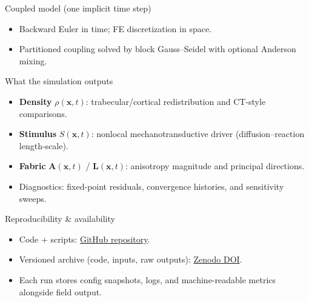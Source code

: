 \documentclass[final]{beamer}
\newlength{\colwidth}
\begin{document}
\begin{frame}[t]
\begin{columns}[t,totalwidth=\textwidth]
\begin{column}{\colwidth}
\begin{alertblock}{Coupled model (one implicit time step)}
\begin{center}
{%
          }
        \end{center}
        \vspace{-0.2cm}
        \begin{itemize}\itemsep0.35em
          \item Backward Euler in time; FE discretization in space.
          \item Partitioned coupling solved by block Gauss--Seidel with optional Anderson mixing.
        \end{itemize}
      \end{alertblock}

      \begin{block}{What the simulation outputs}
        \begin{itemize}\itemsep0.35em
          \item \textbf{Density} $\rho(\mathbf{x},t)$: trabecular/cortical redistribution and CT-style comparisons.
          \item \textbf{Stimulus} $S(\mathbf{x},t)$: nonlocal mechanotransductive driver (diffusion--reaction length-scale).
          \item \textbf{Fabric} $\mathbf{A}(\mathbf{x},t)$ / $\mathbf{L}(\mathbf{x},t)$: anisotropy magnitude and principal directions.
          \item Diagnostics: fixed-point residuals, convergence histories, and sensitivity sweeps.
        \end{itemize}
      \end{block}

      \begin{block}{Reproducibility \& availability}
        \begin{itemize}\itemsep0.35em
          \item Code + scripts: \href{https://github.com/petr-henys/Smoothly-Coupled-Remodeling-with-Nonlocal-Stimulus-and-Fabric-Guided-Anisotropy.git}{GitHub repository}.
          \item Versioned archive (code, inputs, raw outputs): \href{https://doi.org/10.5281/zenodo.18242655}{Zenodo DOI}.
          \item Each run stores config snapshots, logs, and machine-readable metrics alongside field output.
        \end{itemize}
      \end{block}
    \end{column}


\end{columns}
\end{frame}
\end{document}
